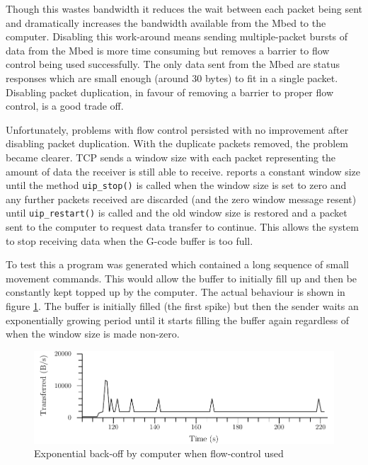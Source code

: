 		Though this wastes bandwidth it reduces the wait between each packet being
		sent and dramatically increases the bandwidth available from the Mbed to the
		computer. Disabling this work-around means sending multiple-packet bursts of
		data from the Mbed is more time consuming but removes a barrier to flow
		control being used successfully. The only data sent from the Mbed are status
		responses which are small enough (around 30 bytes) to fit in a single
		packet. Disabling packet duplication, in favour of removing a barrier to
		proper flow control, is a good trade off.
		
		\label{sec:tcpProblem}
		
		Unfortunately, problems with flow control persisted with no improvement
		after disabling packet duplication. With the duplicate packets removed, the
		problem became clearer. TCP sends a window size with each packet
		representing the amount of data the receiver is still able to receive.
		\uIP{} reports a constant window size until the method \verb|uip_stop()| is
		called when the window size is set to zero and any further packets received
		are discarded (and the zero window message resent) until
		\verb|uip_restart()| is called and the old window size is restored and a
		packet sent to the computer to request data transfer to continue. This
		allows the system to stop receiving data when the G-code buffer is too full.
		
		To test this a program was generated which contained a long sequence of
		small movement commands. This would allow the buffer to initially fill up
		and then be constantly kept topped up by the computer. The actual behaviour
		is shown in figure \ref{fig:uIPFlowControl}. The buffer is initially filled
		(the first spike) but then the sender waits an exponentially growing period
		until it starts filling the buffer again regardless of when the window size
		is made non-zero.
		
		\begin{figure}
			\includegraphics[width=1\textwidth]{diagrams/uIPFlowControl.pdf}
			\caption{Exponential back-off by computer when \uIP{} flow-control used}
			\label{fig:uIPFlowControl}
		\end{figure}
		
